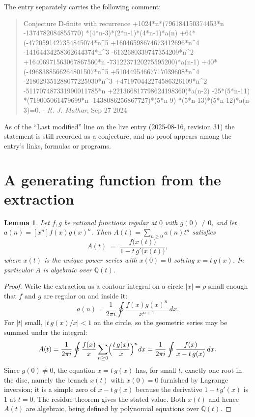 \documentclass[11pt,a4paper]{article}
\theoremstyle{plain}
\newtheorem{lemma}[theorem]{Lemma}
\theoremstyle{definition}
\begin{document}
The entry separately carries the following comment:
\begin{quote}\small
Conjecture D-finite with recurrence +1024*n*(796184150374453*n -1374782084855770) *(4*n-3)*(2*n-1)*(4*n-1)*a(n) +64*(-4720591427354845074*n\^{}5 +16046598674673412696*n\^{}4 -14164434258362644374*n\^{}3 -6132680339747354209*n\^{}2 +16406971563067867560*n -7312237120275595200)*a(n-1) +40*(-4968388566264801507*n\^{}5 +51044954667717039608*n\^{}4 -218029351288077225930*n\^{}3 +471970442274586326109*n\^{}2 -511707487331990011785*n +221366817798624198360)*a(n-2) -25*(5*n-11) *(719005061479699*n -1438086256867727)*(5*n-9) *(5*n-13)*(5*n-12)*a(n-3)=0. - \emph{R. J. Mathar}, Sep 27 2024
\end{quote}
As of the ``Last modified'' line on the live entry (2025-08-16, revision 31) the
statement is still recorded as a conjecture, and no proof appears among the entry's links,
formulas or programs.

\section{A generating function from the extraction}

\begin{lemma}\label{lem:diag}
Let $f,g$ be rational functions regular at $0$ with $g(0)\neq0$, and let
$a(n)=[x^{n}]f(x)g(x)^{n}$. Then $A(t)=\sum_{n\ge0}a(n)t^{n}$ satisfies
\[
A(t)\;=\;\frac{f\bigl(x(t)\bigr)}{1-t\,g'\bigl(x(t)\bigr)},
\]
where $x(t)$ is the unique power series with $x(0)=0$ solving $x=t\,g(x)$. In particular
$A$ is algebraic over $\mathbb{Q}(t)$.
\end{lemma}

\begin{proof}
Write the extraction as a contour integral on a circle $|x|=\rho$ small enough that $f$
and $g$ are regular on and inside it:
\[
a(n)=\frac{1}{2\pi i}\oint \frac{f(x)g(x)^{n}}{x^{n+1}}\,dx .
\]
For $|t|$ small, $|t\,g(x)/x|<1$ on the circle, so the geometric series may be summed
under the integral:
\[
A(t)=\frac{1}{2\pi i}\oint\frac{f(x)}{x}\sum_{n\ge0}\Bigl(\frac{t\,g(x)}{x}\Bigr)^{n}dx
     =\frac{1}{2\pi i}\oint\frac{f(x)}{x-t\,g(x)}\,dx .
\]
Since $g(0)\neq0$, the equation $x=t\,g(x)$ has, for small $t$, exactly one root in the
disc, namely the branch $x(t)$ with $x(0)=0$ furnished by Lagrange inversion; it is a
simple zero of $x-t\,g(x)$ because the derivative $1-t\,g'(x)$ is $1$ at $t=0$. The
residue theorem gives the stated value. Both $x(t)$ and hence $A(t)$ are algebraic,
being defined by polynomial equations over $\mathbb{Q}(t)$.
\end{proof}
\end{document}
